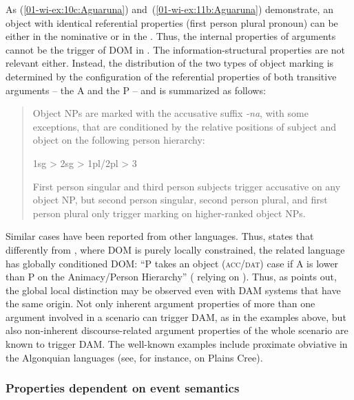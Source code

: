 \documentclass[output=paper]{LSP/langsci}
\begin{document}
\noindent As (\ref{01-wi-ex:10c:Aguaruna}) and~(\ref{01-wi-ex:11b:Aguaruna}) demonstrate, an object with identical referential properties (first person plural pronoun) can be either in the nominative or in the . 
Thus, the internal properties of arguments cannot be the trigger of DOM in . 
The information-structural properties are not relevant either. 
Instead, the distribution of the two types of object marking is determined by the configuration of the referential properties of both transitive arguments – the A and the P – and is summarized as follows:

\begin{quote}
Object NPs are marked with the accusative suffix \textit{-na}, with some exceptions, that are conditioned by the relative positions of subject and object on the following person hierarchy:

1sg > 2sg > 1pl/2pl > 3

First person singular and third person subjects trigger accusative  on any object NP, but second person singular, second person plural, and first person plural only trigger marking on higher-ranked object NPs. \citep[168--169]{Overall2007Grammar}
\end{quote}

Similar cases have been reported from other languages. 
Thus, \citet[213]{Malchukov2008Animacy} states that differently from , where DOM is purely locally constrained, the related language  has globally conditioned DOM: “P takes an object \textsc{(acc/dat)} case if A is lower than P on the Animacy/Person Hierarchy” (\citealt[213]{Malchukov2008Animacy} relying on \citealt[155]{Walietal1997Kashmiri}). 
Thus, as \citet{Malchukov2008Animacy} points out, the global \vs local distinction may be observed even with DAM systems that have the same origin.
Not only inherent argument properties of more than one argument involved in a scenario can trigger DAM, as in the examples above, but also non-inherent discourse-related argument properties of the whole scenario are known to trigger DAM.
The well-known examples include proximate \vs obviative  in the Algonquian languages (see, for instance, \citealt{Dahlstrom1986Plains} on Plains Cree).

\subsubsection{Properties dependent on event semantics}
\label{01-wi-sec:2.1.6-Properties-dependent}
\end{document}
